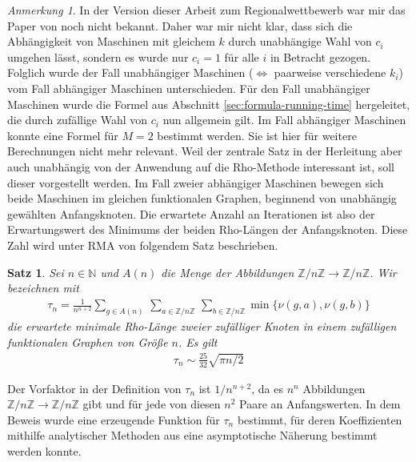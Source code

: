 \documentclass[a4paper, 11pt, ngerman]{article}
\newcommand{\N}{\mathbb{N}}
\newcommand{\Z}{\mathbb{Z}}
\theoremstyle{definition}
\theoremstyle{plain}
\newtheorem{theorem}{Satz}
\theoremstyle{remark}
\newtheorem*{remark*}{Anmerkung}
\begin{document}
\begin{remark*}
    In der Version dieser Arbeit zum Regionalwettbewerb war mir das Paper von \cite{cr99} noch nicht bekannt. Daher war mir nicht klar, dass sich die Abhängigkeit von Maschinen mit gleichem $k$ durch unabhängige Wahl von $c_i$ umgehen lässt, sondern es wurde nur $c_i = 1$ für alle $i$ in Betracht gezogen. Folglich wurde der Fall unabhängiger Maschinen ($\Longleftrightarrow$ paarweise verschiedene $k_i$) vom Fall abhängiger Maschinen unterschieden. Für den Fall unabhängiger Maschinen wurde die Formel aus Abschnitt \ref{sec:formula-running-time} hergeleitet, die durch zufällige Wahl von $c_i$ nun allgemein gilt. Im Fall abhängiger Maschinen konnte eine Formel für $M = 2$ bestimmt werden. Sie ist hier für weitere Berechnungen nicht mehr relevant. Weil der zentrale Satz in der Herleitung aber auch unabhängig von der Anwendung auf die Rho-Methode interessant ist, soll dieser vorgestellt werden. Im Fall zweier abhängiger Maschinen bewegen sich beide Maschinen im gleichen funktionalen Graphen, beginnend von unabhängig gewählten Anfangsknoten. Die erwartete Anzahl an Iterationen ist also der Erwartungswert des Minimums der beiden Rho-Längen der Anfangsknoten. Diese Zahl wird unter RMA von folgendem Satz beschrieben.
\end{remark*}

\begin{theorem}
    \label{theorem:min-rho-len-m2}
    Sei $n \in \N$ und $A(n)$ die Menge der Abbildungen $\Z/n\Z \to \Z/n\Z$. Wir bezeichnen mit
    \begin{align*}
        \tau_n =  \frac 1 {n^{n + 2}}
        \sum_{g \in A(n)} \, \sum_{a \in \Z/n\Z} \, \sum_{b \in \Z/n\Z}
        \min\{\nu(g, a), \nu(g, b)\}
    \end{align*}
    die erwartete minimale Rho-Länge zweier zufälliger Knoten in einem zufälligen funktionalen Graphen von Größe $n$.  Es gilt
    \begin{align*}
        \tau_n \sim \frac {25} {32} \sqrt{\pi n / 2}
    \end{align*}
\end{theorem}

Der Vorfaktor in der Definition von $\tau_n$ ist $1/n^{n + 2}$, da es $n^n$ Abbildungen $\Z/n\Z \to \Z/n\Z$ gibt und für jede von diesen $n^2$ Paare an Anfangswerten. In dem Beweis wurde eine erzeugende Funktion für $\tau_n$ bestimmt, für deren Koeffizienten mithilfe analytischer Methoden aus \cite{fs09} eine asymptotische Näherung bestimmt werden konnte.
\end{document}
